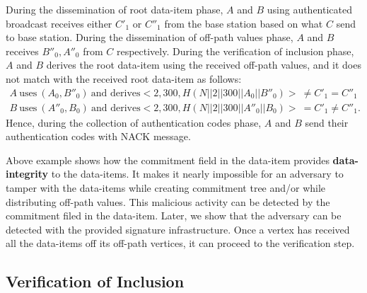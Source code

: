\begin{exmp}
			During the dissemination of root data-item phase, $A$ and $B$ using authenticated broadcast receives either $C'_{1}$ or $C''_{1}$ from the base station based on what $C$ send to base station.
			During the dissemination of off-path values phase, $A$ and $B$ receives $B''_{0},A''_{0}$ from $C$ respectively.
			During the verification of inclusion phase, $A$ and $B$ derives the root data-item using the received off-path values, and it does not match with the received root data-item as follows:
			\begin{equation}
				\begin{array}{l}
					A\ \mbox{uses}\ (A_{0}, B''_{0})\ \mbox{and derives} <2,300,H(N||2||300||A_{0}||B''_{0})>\  \neq C'_{1} = C''_{1}\\
					B\ \mbox{uses}\ (A''_{0}, B_{0})\ \mbox{and derives} <2,300,H(N||2||300||A''_{0}||B_{0})>\  = C'_{1} \neq C''_{1}.
				\end{array}
			\end{equation}
			Hence, during the collection of authentication codes phase, $A$ and $B$ send their authentication codes with NACK message.
		\end{exmp}
			Above example shows how the commitment field in the data-item provides \textbf{data-integrity} to the data-items.
			It makes it nearly impossible for an adversary to tamper with the data-items while creating commitment tree and/or while distributing off-path values.
			This malicious activity can be detected by the commitment filed in the data-item.
			Later, we show that the adversary can be detected with the provided signature infrastructure.
			Once a vertex has received all the data-items off its off-path vertices, it can proceed to the verification step.
	
	\subsection{Verification of Inclusion}
	
